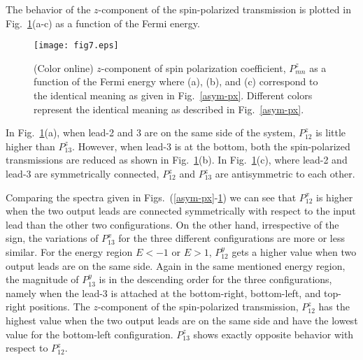 \documentclass[prb,aps,twocolumn,amsmath,amssymb,floatfix,
superscriptaddress]{revtex4}
\begin{document}
The behavior of the $z$-component of the spin-polarized transmission
is plotted in Fig.~\ref{asym-pz}(a-c) as a function of the Fermi
energy.
\begin{figure}[h]
\centering
\texttt{[image: fig7.eps]}
\caption{(Color online) $z$-component of spin polarization
  coefficient, $P^z_{mn}$ as a function of the Fermi energy where (a),
  (b), and (c) correspond to the identical meaning as given in
  Fig.~\ref{asym-px}. Different colors represent the identical meaning
  as described in Fig.~\ref{asym-px}.}
\label{asym-pz}
\end{figure}
In Fig.~\ref{asym-pz}(a), when lead-2 and 3 are on the same side of
the system, $P^z_{12}$ is little higher than $P^z_{13}$. However, when
lead-3 is at the bottom, both the spin-polarized transmissions are
reduced as shown in Fig.~\ref{asym-pz}(b). In Fig.~\ref{asym-pz}(c),
where lead-2 and lead-3 are symmetrically connected, $P^z_{12}$ and
$P^z_{13}$ are antisymmetric to each other.




Comparing the spectra given in Figs.~(\ref{asym-px}-\ref{asym-pz}) we
can see that $P^x_{12}$ is higher when the two output leads are
connected symmetrically with respect to the input lead than the other
two configurations. On the other hand, irrespective of the sign, the
variations of $P^x_{13}$ for the three different configurations are
more or less similar. For the energy region $E<-1$ or $E>1$,
$P^y_{12}$ gets a higher value when two output leads are on the same
side. Again in the same mentioned energy region, the magnitude of
$P^y_{13}$ is in the descending order for the three configurations,
namely when the lead-3 is attached at the bottom-right, bottom-left,
and top-right positions. The $z$-component of the spin-polarized
transmission, $P^z_{12}$ has the highest value when the two output
leads are on the same side and have the lowest value for the
bottom-left configuration. $P^z_{13}$ shows exactly opposite behavior
with respect to $P^z_{12}$.
\end{document}
